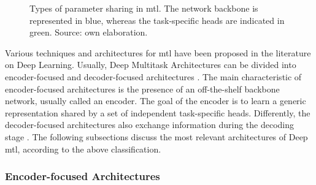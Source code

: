 \begin{figure}[ht]
\centering
{}
\hfill
{} 
\caption{Types of parameter sharing in \acl{mtl}. The network backbone is represented in blue, whereas the task-specific heads are indicated in green. Source: own elaboration.}
\label{fig:mtl_sharing}
\end{figure}
 
Various techniques and architectures for \acs{mtl} have been proposed in the literature on Deep Learning. Usually, Deep Multitask Architectures can be divided into encoder-focused and decoder-focused architectures \citep{vandenhende2021multi}. The main characteristic of encoder-focused architectures \citep{kendall2018multi, chen2018gradnorm, sener2018multi} is the presence of an off-the-shelf backbone network, usually called an encoder. The goal of the encoder is to learn a generic representation shared by a set of independent task-specific heads. Differently, the decoder-focused architectures also exchange information during the decoding stage \citep{xu2018pad, zhang2018joint, vandenhende2020mti}. The following subsections discuss the most relevant architectures of Deep \acl{mtl}, according to the above classification.
 
\subsubsection{Encoder-focused Architectures}
 
